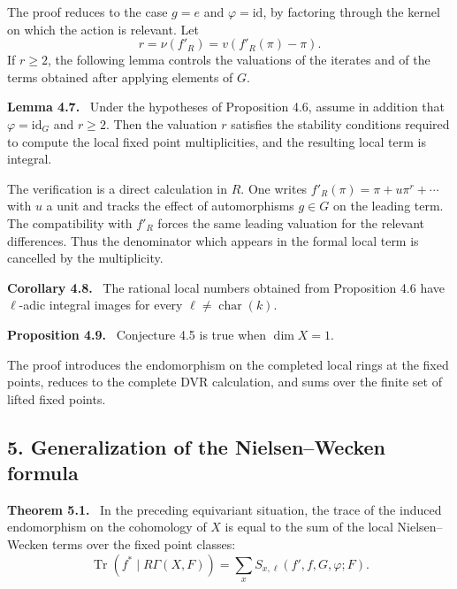 \documentclass[11pt]{article}
\theoremstyle{plain}
\theoremstyle{definition}
\theoremstyle{remark}
\newenvironment{statement}[1]{\par\medskip\noindent\textbf{#1.}\ }{\par\medskip}
\begin{document}
The proof reduces to the case $g=e$ and $\varphi=\mathrm{id}$, by factoring through the kernel on which the action is relevant. Let
\[
   r=\nu(f'_R)=v(f'_R(\pi)-\pi).
\]
If $r\ge2$, the following lemma controls the valuations of the iterates and of the terms obtained after applying elements of $G$.

\begin{statement}{Lemma 4.7}
Under the hypotheses of Proposition 4.6, assume in addition that $\varphi=\mathrm{id}_G$ and $r\ge2$. Then the valuation $r$ satisfies the stability conditions required to compute the local fixed point multiplicities, and the resulting local term is integral.
\end{statement}

The verification is a direct calculation in $R$. One writes $f'_R(\pi)=\pi+u\pi^r+\cdots$ with $u$ a unit and tracks the effect of automorphisms $g\in G$ on the leading term. The compatibility with $f'_R$ forces the same leading valuation for the relevant differences. Thus the denominator which appears in the formal local term is cancelled by the multiplicity.

\begin{statement}{Corollary 4.8}
The rational local numbers obtained from Proposition 4.6 have $\ell$-adic integral images for every $\ell\ne\operatorname{char}(k)$.
\end{statement}

\begin{statement}{Proposition 4.9}
Conjecture 4.5 is true when $\dim X=1$.
\end{statement}

The proof introduces the endomorphism on the completed local rings at the fixed points, reduces to the complete DVR calculation, and sums over the finite set of lifted fixed points.

\subsection*{5. Generalization of the Nielsen--Wecken formula}

\begin{statement}{Theorem 5.1}
In the preceding equivariant situation, the trace of the induced endomorphism on the cohomology of $X$ is equal to the sum of the local Nielsen--Wecken terms over the fixed point classes:
\[
   \operatorname{Tr}(f^*\mid R\Gamma(X,F))
      =\sum_x S_{x,\ell}(f',f,G,\varphi;F).
\]
\end{statement}
\end{document}
